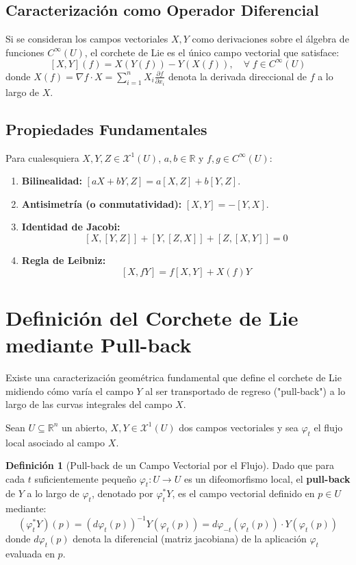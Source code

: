 \documentclass[11pt,a4paper]{article}
\theoremstyle{definition}
\newtheorem{definicion}{Definición}[section]
\theoremstyle{plain}
\theoremstyle{remark}
\begin{document}
	\subsection*{Caracterización como Operador Diferencial}
	
	Si se consideran los campos vectoriales $X, Y$ como derivaciones sobre el álgebra de funciones $C^\infty(U)$, el corchete de Lie es el único campo vectorial que satisface:
	\[
	[X, Y](f) = X(Y(f)) - Y(X(f)), \quad \forall \; f \in C^\infty(U)
	\]
	donde $X(f) = \nabla f \cdot X = \sum_{i=1}^n X_i \frac{\partial f}{\partial x_i}$ denota la derivada direccional de $f$ a lo largo de $X$.
	
	\subsection*{Propiedades Fundamentales}
	
	Para cualesquiera $X, Y, Z \in \mathcal{X}^1(U)$, $a, b \in \mathbb{R}$ y $f, g \in C^\infty(U)$:
	\begin{enumerate}
		\item \textbf{Bilinealidad:} $[a X + b Y, Z] = a [X, Z] + b [Y, Z]$.
		\item \textbf{Antisimetría (o conmutatividad):} $[X, Y] = -[Y, X]$.
		\item \textbf{Identidad de Jacobi:} 
		\[
		[X, [Y, Z]] + [Y, [Z, X]] + [Z, [X, Y]] = 0
		\]
		\item \textbf{Regla de Leibniz:} 
		\[
		[X, f Y] = f [X, Y] + X(f) Y
		\]
	\end{enumerate}
	
	\section*{Definición del Corchete de Lie mediante Pull-back}
	
	Existe una caracterización geométrica fundamental que define el corchete de Lie midiendo cómo varía el campo $Y$ al ser transportado de regreso ("pull-back") a lo largo de las curvas integrales del campo $X$.
	
	Sean $U \subseteq \mathbb{R}^n$ un abierto, $X, Y \in \mathcal{X}^1(U)$ dos campos vectoriales y sea $\varphi_t$ el flujo local asociado al campo $X$.
	
	\begin{definicion}[Pull-back de un Campo Vectorial por el Flujo]
		Dado que para cada $t$ suficientemente pequeño $\varphi_t : U \to U$ es un difeomorfismo local, el \textbf{pull-back} de $Y$ a lo largo de $\varphi_t$, denotado por $\varphi_t^* Y$, es el campo vectorial definido en $p \in U$ mediante:
		\[
		(\varphi_t^* Y)(p) = \left( d\varphi_t(p) \right)^{-1} Y(\varphi_t(p)) = d\varphi_{-t}(\varphi_t(p)) \cdot Y(\varphi_t(p))
		\]
		donde $d\varphi_t(p)$ denota la diferencial (matriz jacobiana) de la aplicación $\varphi_t$ evaluada en $p$.
	\end{definicion}
	
\end{document}

